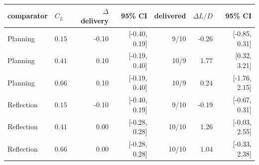 \begin{tabular}{llrrrrr}
\toprule
comparator & $C_L$ & $\Delta$ delivery & 95\% CI & delivered & $\Delta L/D$ & 95\% CI \\
\midrule
Planning & $0.15$ & -0.10 & [-0.40, 0.19] & 9/10 & -0.26 & [-0.85, 0.31] \\
Planning & $0.41$ & 0.10 & [-0.19, 0.40] & 10/9 & 1.77 & [0.32, 3.21] \\
Planning & $0.66$ & 0.10 & [-0.19, 0.40] & 10/9 & 0.24 & [-1.76, 2.15] \\
Reflection & $0.15$ & -0.10 & [-0.40, 0.19] & 9/10 & -0.19 & [-0.67, 0.31] \\
Reflection & $0.41$ & 0.00 & [-0.28, 0.28] & 10/10 & 1.26 & [-0.03, 2.55] \\
Reflection & $0.66$ & 0.00 & [-0.28, 0.28] & 10/10 & 1.04 & [-0.33, 2.38] \\
\bottomrule
\end{tabular}
